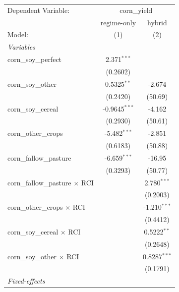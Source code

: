 
\begingroup
\centering
\begin{tabular}{lcc}
   \tabularnewline \midrule \midrule
   Dependent Variable: & \multicolumn{2}{c}{corn\_yield}\\
                                         & regime-only     & hybrid \\   
   Model:                                & (1)             & (2)\\  
   \midrule
   \emph{Variables}\\
   corn\_soy\_perfect                    & 2.371$^{***}$   &   \\   
                                         & (0.2602)        &   \\   
   corn\_soy\_other                      & 0.5325$^{**}$   & -2.674\\   
                                         & (0.2420)        & (50.69)\\   
   corn\_soy\_cereal                     & -0.9645$^{***}$ & -4.162\\   
                                         & (0.2930)        & (50.61)\\   
   corn\_other\_crops                    & -5.482$^{***}$  & -2.851\\   
                                         & (0.6183)        & (50.88)\\   
   corn\_fallow\_pasture                 & -6.659$^{***}$  & -16.95\\   
                                         & (0.3293)        & (50.77)\\   
   corn\_fallow\_pasture $\times$ RCI    &                 & 2.780$^{***}$\\   
                                         &                 & (0.2003)\\   
   corn\_other\_crops $\times$ RCI       &                 & -1.210$^{***}$\\   
                                         &                 & (0.4412)\\   
   corn\_soy\_cereal $\times$ RCI        &                 & 0.5222$^{**}$\\   
                                         &                 & (0.2648)\\   
   corn\_soy\_other $\times$ RCI         &                 & 0.8287$^{***}$\\   
                                         &                 & (0.1791)\\   
   \midrule
   \emph{Fixed-effects}\\

\end{tabular}
